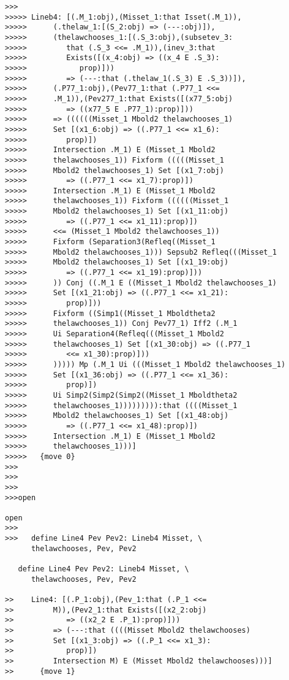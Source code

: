 \documentclass[12pt]{article}
\begin{document}
\begin{verbatim}
>>>
>>>>> Lineb4: [(.M_1:obj),(Misset_1:that Isset(.M_1)),
>>>>>      (.thelaw_1:[(S_2:obj) => (---:obj)]),
>>>>>      (thelawchooses_1:[(.S_3:obj),(subsetev_3:
>>>>>         that (.S_3 <<= .M_1)),(inev_3:that
>>>>>         Exists([(x_4:obj) => ((x_4 E .S_3):
>>>>>            prop)]))
>>>>>         => (---:that (.thelaw_1(.S_3) E .S_3))]),
>>>>>      (.P77_1:obj),(Pev77_1:that (.P77_1 <<=
>>>>>      .M_1)),(Pev277_1:that Exists([(x77_5:obj)
>>>>>         => ((x77_5 E .P77_1):prop)]))
>>>>>      => ((((((Misset_1 Mbold2 thelawchooses_1)
>>>>>      Set [(x1_6:obj) => ((.P77_1 <<= x1_6):
>>>>>         prop)])
>>>>>      Intersection .M_1) E (Misset_1 Mbold2
>>>>>      thelawchooses_1)) Fixform (((((Misset_1
>>>>>      Mbold2 thelawchooses_1) Set [(x1_7:obj)
>>>>>         => ((.P77_1 <<= x1_7):prop)])
>>>>>      Intersection .M_1) E (Misset_1 Mbold2
>>>>>      thelawchooses_1)) Fixform ((((((Misset_1
>>>>>      Mbold2 thelawchooses_1) Set [(x1_11:obj)
>>>>>         => ((.P77_1 <<= x1_11):prop)])
>>>>>      <<= (Misset_1 Mbold2 thelawchooses_1))
>>>>>      Fixform (Separation3(Refleq((Misset_1
>>>>>      Mbold2 thelawchooses_1))) Sepsub2 Refleq(((Misset_1
>>>>>      Mbold2 thelawchooses_1) Set [(x1_19:obj)
>>>>>         => ((.P77_1 <<= x1_19):prop)]))
>>>>>      )) Conj ((.M_1 E ((Misset_1 Mbold2 thelawchooses_1)
>>>>>      Set [(x1_21:obj) => ((.P77_1 <<= x1_21):
>>>>>         prop)]))
>>>>>      Fixform ((Simp1((Misset_1 Mboldtheta2
>>>>>      thelawchooses_1)) Conj Pev77_1) Iff2 (.M_1
>>>>>      Ui Separation4(Refleq(((Misset_1 Mbold2
>>>>>      thelawchooses_1) Set [(x1_30:obj) => ((.P77_1
>>>>>         <<= x1_30):prop)]))
>>>>>      ))))) Mp (.M_1 Ui (((Misset_1 Mbold2 thelawchooses_1)
>>>>>      Set [(x1_36:obj) => ((.P77_1 <<= x1_36):
>>>>>         prop)])
>>>>>      Ui Simp2(Simp2(Simp2((Misset_1 Mboldtheta2
>>>>>      thelawchooses_1))))))))):that ((((Misset_1
>>>>>      Mbold2 thelawchooses_1) Set [(x1_48:obj)
>>>>>         => ((.P77_1 <<= x1_48):prop)])
>>>>>      Intersection .M_1) E (Misset_1 Mbold2
>>>>>      thelawchooses_1)))]
>>>>>   {move 0}
>>>
>>>
>>>
>>>open

open
>>>
>>>   define Line4 Pev Pev2: Lineb4 Misset, \
      thelawchooses, Pev, Pev2

   define Line4 Pev Pev2: Lineb4 Misset, \
      thelawchooses, Pev, Pev2

>>    Line4: [(.P_1:obj),(Pev_1:that (.P_1 <<=
>>         M)),(Pev2_1:that Exists([(x2_2:obj)
>>            => ((x2_2 E .P_1):prop)]))
>>         => (---:that ((((Misset Mbold2 thelawchooses)
>>         Set [(x1_3:obj) => ((.P_1 <<= x1_3):
>>            prop)])
>>         Intersection M) E (Misset Mbold2 thelawchooses)))]
>>      {move 1}



\end{verbatim}
\end{document}
